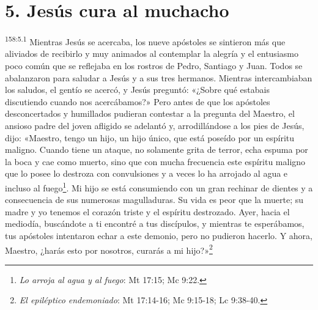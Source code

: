 \section*{5. Jesús cura al muchacho}
\par
\textsuperscript{158:5.1} Mientras Jesús se acercaba, los nueve apóstoles se sintieron más que aliviados de recibirlo y muy animados al contemplar la alegría y el entusiasmo poco común que se reflejaba en los rostros de Pedro, Santiago y Juan. Todos se abalanzaron para saludar a Jesús y a sus tres hermanos. Mientras intercambiaban los saludos, el gentío se acercó, y Jesús preguntó: «¿Sobre qué estabais discutiendo cuando nos acercábamos?» Pero antes de que los apóstoles desconcertados y humillados pudieran contestar a la pregunta del Maestro, el ansioso padre del joven afligido se adelantó y, arrodillándose a los pies de Jesús, dijo: «Maestro, tengo un hijo, un hijo único, que está poseído por un espíritu maligno. Cuando tiene un ataque, no solamente grita de terror, echa espuma por la boca y cae como muerto, sino que con mucha frecuencia este espíritu maligno que lo posee lo destroza con convulsiones y a veces lo ha arrojado al agua e incluso al fuego\footnote{\textit{Lo arroja al agua y al fuego}: Mt 17:15; Mc 9:22.}. Mi hijo se está consumiendo con un gran rechinar de dientes y a consecuencia de sus numerosas magulladuras. Su vida es peor que la muerte; su madre y yo tenemos el corazón triste y el espíritu destrozado. Ayer, hacia el mediodía, buscándote a ti encontré a tus discípulos, y mientras te esperábamos, tus apóstoles intentaron echar a este demonio, pero no pudieron hacerlo. Y ahora, Maestro, ¿harás esto por nosotros, curarás a mi hijo?»\footnote{\textit{El epiléptico endemoniado}: Mt 17:14-16; Mc 9:15-18; Lc 9:38-40.}

